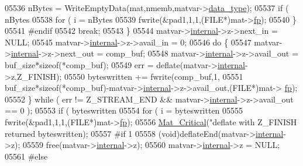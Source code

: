 \begin{DoxyCode}
{{{{{{{{{{{{{{{{{{{{{{{{{{{{{{{{05536                     nBytes = WriteEmptyData(mat,nmemb,matvar->\hyperlink{group___m_a_t_ab6aafe9bd77f0f077852593dec438144}{data\_type});
05537                     \textcolor{keywordflow}{if} ( nBytes %
05538                         \textcolor{keywordflow}{for} ( i = nBytes %
05539                             fwrite(&pad1,1,1,(FILE*)mat->\hyperlink{struct__mat__t_a85f562e407ca9ad4d2a6e14f839432b7}{fp});
05540                 \}
05541 \textcolor{preprocessor}{#endif}
05542                 \textcolor{keywordflow}{break};
05543         \}
05544         matvar->\hyperlink{group___m_a_t_a6e97e3ed9f40c49322c18561c2a94e92}{internal}->z->next\_in  = NULL;
05545         matvar->\hyperlink{group___m_a_t_a6e97e3ed9f40c49322c18561c2a94e92}{internal}->z->avail\_in = 0;
05546         \textcolor{keywordflow}{do} \{
05547             matvar->\hyperlink{group___m_a_t_a6e97e3ed9f40c49322c18561c2a94e92}{internal}->z->next\_out  = comp\_buf;
05548             matvar->\hyperlink{group___m_a_t_a6e97e3ed9f40c49322c18561c2a94e92}{internal}->z->avail\_out = buf\_size*\textcolor{keyword}{sizeof}(*comp\_buf);
05549             err = deflate(matvar->\hyperlink{group___m_a_t_a6e97e3ed9f40c49322c18561c2a94e92}{internal}->z,Z\_FINISH);
05550             byteswritten += fwrite(comp\_buf,1,
05551                 buf\_size*\textcolor{keyword}{sizeof}(*comp\_buf)-matvar->\hyperlink{group___m_a_t_a6e97e3ed9f40c49322c18561c2a94e92}{internal}->z->avail\_out,(FILE*)mat->
      \hyperlink{struct__mat__t_a85f562e407ca9ad4d2a6e14f839432b7}{fp});
05552         \} \textcolor{keywordflow}{while} ( err != Z\_STREAM\_END && matvar->\hyperlink{group___m_a_t_a6e97e3ed9f40c49322c18561c2a94e92}{internal}->z->avail\_out == 0 );
05553         \textcolor{keywordflow}{if} ( byteswritten %
05554             \textcolor{keywordflow}{for} ( i = byteswritten %
05555                 fwrite(&pad1,1,1,(FILE*)mat->\hyperlink{struct__mat__t_a85f562e407ca9ad4d2a6e14f839432b7}{fp});
05556         \hyperlink{group__mat__util_gaf51f2bfbb5580f575e4dd79757e2b80c}{Mat\_Critical}(\textcolor{stringliteral}{"deflate with Z\_FINISH returned %
      byteswritten);
05557 \textcolor{preprocessor}{#if 1}
05558         (void)deflateEnd(matvar->\hyperlink{group___m_a_t_a6e97e3ed9f40c49322c18561c2a94e92}{internal}->z);
05559         free(matvar->\hyperlink{group___m_a_t_a6e97e3ed9f40c49322c18561c2a94e92}{internal}->z);
05560         matvar->\hyperlink{group___m_a_t_a6e97e3ed9f40c49322c18561c2a94e92}{internal}->z = NULL;
05561 \textcolor{preprocessor}{#else}
}}}}}}}}}}}}}}}}}}}}}}}}}}}}}}}}}
\end{DoxyCode}
